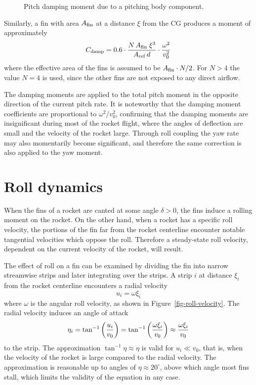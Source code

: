 \begin{figure}
\centering
{}
\caption{Pitch damping moment due to a pitching body component.}
\label{fig-pitch-velocity}
\end{figure}



Similarly, a fin with area $A_{\rm fin}$ at a distance $\xi$ from the CG
produces a moment of approximately
%
\begin{equation}
C_{\rm damp} = 
    0.6\cdot \frac{N\,A_{\rm fin}\;\xi^3}{A_{\rm ref}\,d}\cdot\frac{\omega^2}{v_0^2}
\end{equation}
%
where the effective area of the fins is assumed to be 
$A_{\rm fin}\cdot N/2$.  For $N>4$ the value $N=4$ is used, since the other
fins are not exposed to any direct airflow.

The damping moments are applied to the total pitch moment in the
opposite direction of the current pitch rate.  It is noteworthy
that the damping moment coefficients are proportional to $\omega^2/v_0^2$,
confirming that the damping moments are insignificant during most of
the rocket flight, where the angles of deflection are small and the
velocity of the rocket large.  Through roll coupling the yaw rate may also
momentarily become significant, and therefore the same correction is
also applied to the yaw moment.





\clearpage
\section{Roll dynamics}
\label{sec-roll-dynamics}

When the fins of a rocket are canted at some angle $\delta>0$, the
fins induce a rolling moment on the rocket.  On the other hand, when a
rocket has a specific roll velocity, the portions of the fin far from
the rocket centerline encounter notable tangential velocities
which oppose the roll.  Therefore a steady-state roll velocity,
dependent on the current velocity of the rocket, will result.

The effect of roll on a fin can be examined by dividing the fin into
narrow streamwise strips and later integrating over the strips.  A
strip $i$ at distance $\xi_i$ from the rocket centerline encounters a
radial velocity
%
\begin{equation}
u_i = \omega \xi_i
\end{equation}
%
where $\omega$ is the angular roll velocity, as shown in
Figure~\ref{fig-roll-velocity}.  The radial velocity induces an angle
of attack
%
\begin{equation}
\eta_i = \tan^{-1} \del{\frac{u_i}{v_0}} =
\tan^{-1}\del{\frac{\omega\xi_i}{v_0}}
\approx \frac{\omega\xi_i}{v_0}
\label{eq-tan-approx}
\end{equation}
%
to the strip.  The approximation $\tan^{-1} \eta \approx \eta$ is
valid for $u_i\ll v_0$, that is, when the velocity of the rocket is
large compared to the radial velocity.  The approximation is
reasonable up to angles of $\eta \approx 20^\circ$, above which angle
most fins stall, which limits the validity of the equation in any
case.  

